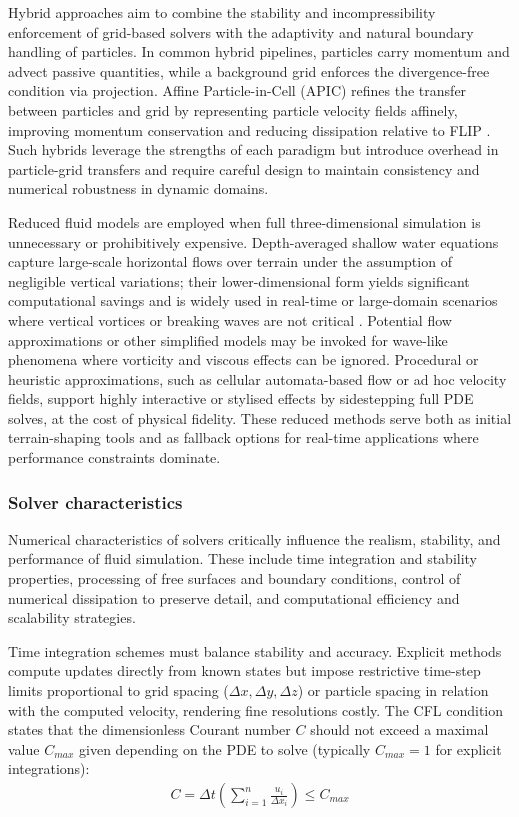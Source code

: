 Hybrid approaches aim to combine the stability and incompressibility enforcement of grid-based solvers with the adaptivity and natural boundary handling of particles. In common hybrid pipelines, particles carry momentum and advect passive quantities, while a background grid enforces the divergence-free condition via projection. Affine Particle-in-Cell (APIC) refines the transfer between particles and grid by representing particle velocity fields affinely, improving momentum conservation and reducing dissipation relative to FLIP \cite{Jiang2015}. Such hybrids leverage the strengths of each paradigm but introduce overhead in particle-grid transfers and require careful design to maintain consistency and numerical robustness in dynamic domains.

Reduced fluid models are employed when full three-dimensional simulation is unnecessary or prohibitively expensive. Depth-averaged shallow water equations capture large-scale horizontal flows over terrain under the assumption of negligible vertical variations; their lower-dimensional form yields significant computational savings and is widely used in real-time or large-domain scenarios where vertical vortices or breaking waves are not critical \cite{Vreugdenhil1994,Pan2012}. Potential flow approximations or other simplified models may be invoked for wave-like phenomena where vorticity and viscous effects can be ignored. Procedural or heuristic approximations, such as cellular automata-based flow or ad hoc velocity fields, support highly interactive or stylised effects by sidestepping full PDE solves, at the cost of physical fidelity. These reduced methods serve both as initial terrain-shaping tools and as fallback options for real-time applications where performance constraints dominate.

\subsubsection{Solver characteristics}

Numerical characteristics of solvers critically influence the realism, stability, and performance of fluid simulation. These include time integration and stability properties, processing of free surfaces and boundary conditions, control of numerical dissipation to preserve detail, and computational efficiency and scalability strategies.

Time integration schemes must balance stability and accuracy. Explicit methods compute updates directly from known states but impose restrictive time-step limits proportional to grid spacing ($\Delta x, \Delta y, \Delta z$) or particle spacing in relation with the computed velocity, rendering fine resolutions costly. The CFL condition states that the dimensionless Courant number $C$ should not exceed a maximal value $C_{max}$ given depending on the PDE to solve (typically $C_{max} = 1$ for explicit integrations):
\begin{align}
    C = \Delta t \left( \sum_{i=1}^{n}{\frac{u_i}{\Delta x_i}} \right) \leq C_{max} \nonumber
\end{align}

